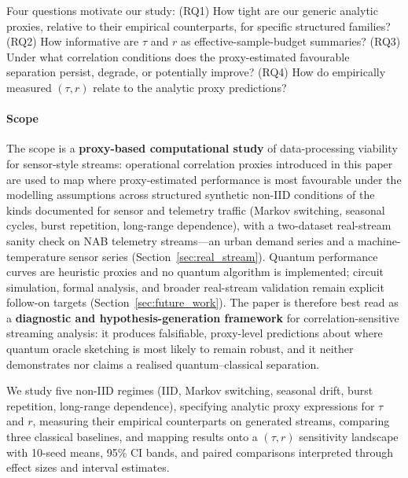 \documentclass[sensors,article,submit,pdftex,moreauthors]{Definitions/mdpi}
\providecommand{\DIFadd}[1]{{\protect\color{blue}#1}} %
\providecommand{\DIFdel}[1]{} %
\providecommand{\DIFaddbegin}{} %
\providecommand{\DIFaddend}{} %
\providecommand{\DIFdelbegin}{} %
\providecommand{\DIFdelend}{} %
\begin{document}
Four questions motivate our study: (RQ1) How tight are \DIFdelbegin \DIFdel{the generic robustness guarantees }\DIFdelend \DIFaddbegin \DIFadd{our generic analytic proxies, relative to their empirical counterparts, }\DIFaddend for specific structured families? (RQ2) How informative are $\tau$ and $r$ as \DIFdelbegin \DIFdel{accuracy predictors}\DIFdelend \DIFaddbegin \DIFadd{effective-sample-budget summaries}\DIFaddend ? (RQ3) Under what correlation conditions does the proxy-estimated favourable separation persist, degrade, or potentially improve? (RQ4) How do empirically measured $(\tau, r)$ relate to the analytic proxy predictions?

\paragraph{Scope} The scope is a \textbf{proxy-based computational study} of data-processing viability for sensor-style streams: operational correlation proxies \DIFdelbegin \DIFdel{inspired by this framework }\DIFdelend \DIFaddbegin \DIFadd{introduced in this paper }\DIFaddend are used to map where proxy-estimated performance is most favourable under the modelling assumptions across structured synthetic non\nobreakdash-IID conditions of the kinds documented for sensor and telemetry traffic (Markov switching, seasonal cycles, burst repetition, long-range dependence), with a two\nobreakdash-dataset real-stream sanity check on NAB telemetry streams---an urban demand series and a machine-temperature sensor series (Section~\ref{sec:real_stream}). Quantum performance curves are heuristic proxies and no quantum algorithm is implemented; circuit simulation, \DIFdelbegin \DIFdel{primary-source theorem reproduction}\DIFdelend \DIFaddbegin \DIFadd{formal analysis}\DIFaddend , and broader real-stream validation remain explicit follow-on targets (Section~\ref{sec:future_work}). \DIFaddbegin \DIFadd{The paper is therefore best read as a }\textbf{\DIFadd{diagnostic and hypothesis-generation framework}} \DIFadd{for correlation-sensitive streaming analysis: it produces falsifiable, proxy-level predictions about where quantum oracle sketching is most likely to remain robust, and it neither demonstrates nor claims a realised quantum--classical separation.
}\DIFaddend 

We study five non\nobreakdash-IID regimes (IID, Markov switching, seasonal drift, burst repetition, long-range dependence), specifying analytic proxy expressions for $\tau$ and $r$, measuring their empirical counterparts on generated streams, comparing three classical baselines, and mapping results onto a $(\tau, r)$ sensitivity landscape with 10-seed means, 95\% CI bands, and paired \DIFdelbegin \DIFdel{Wilcoxon tests}\DIFdelend \DIFaddbegin \DIFadd{comparisons interpreted through effect sizes and interval estimates}\DIFaddend .
\end{document}
